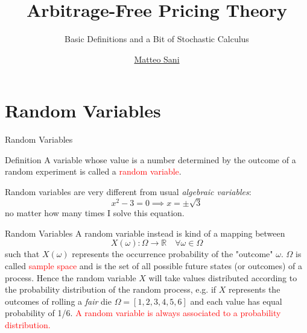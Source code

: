 \documentclass{beamer}
\title{Arbitrage-Free Pricing Theory}
\subtitle{Basic Definitions and a Bit of Stochastic Calculus}
\author{\href{mailto:matteo.sani@unisi.it}{Matteo Sani}}
\begin{document}
	\begin{frame}[plain]
		\maketitle
	\end{frame}


\section{Random Variables}
\begin{frame}{Random Variables}
	\begin{block}{Definition}
	A variable whose value is a number determined by the outcome of a random experiment is called a \textcolor{red}{random variable}.
	\end{block}
	\vspace{0.5 cm}
	\pause
	Random variables are very different from usual \emph{algebraic variables}:
\begin{equation*}
	x^2 - 3 = 0 \implies x = \pm \sqrt{3}
\end{equation*}	
	no matter how many times I solve this equation.
\end{frame}

\begin{frame}{Random Variables}
	A random variable instead is kind of a mapping between 
	\begin{equation*}
		X(\omega):\Omega\rightarrow \mathbb{R}\quad \forall\omega\in\Omega
	\end{equation*}
	such that $X(\omega)$ represents the occurrence probability of the "outcome" $\omega$. $\Omega$ is called \textcolor{red}{sample space} and is the set of all possible future states (or outcomes) of a process.
	\pause
	\vspace{0.5cm}
	Hence the random variable $X$ will take values distributed according to the probability distribution of the random process, e.g. if $X$ represents the outcomes of rolling a \emph{fair} die $\Omega = [1,2,3,4,5,6]$ and each value has equal probability of 1/6.
	\vspace{0.5cm}
	\textcolor{red}{A random variable is always associated to a probability distribution.}
\end{frame}
\end{document}
